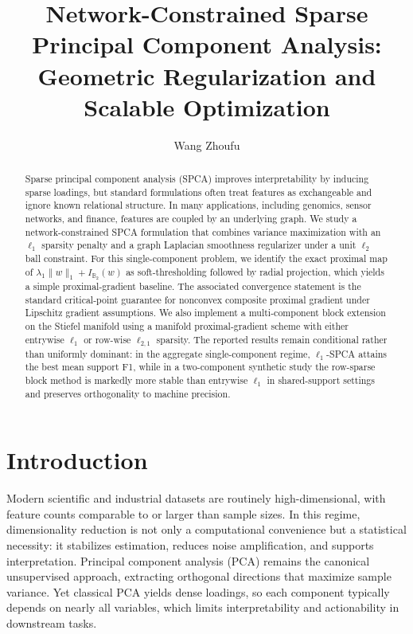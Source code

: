 \documentclass[10pt,twocolumn,letterpaper]{article}
\title{\texorpdfstring{Network-Constrained Sparse Principal Component Analysis: Geometric Regularization and Scalable Optimization}{Network-Constrained Sparse Principal Component Analysis: Geometric Regularization and Scalable Optimization}}
\author{Wang Zhoufu}
\date{}
\theoremstyle{definition}
\begin{document}
\sloppy
\raggedbottom
\maketitle

\begin{abstract}
Sparse principal component analysis (SPCA) improves interpretability by inducing sparse loadings, but standard formulations often treat features as exchangeable and ignore known relational structure. In many applications, including genomics, sensor networks, and finance, features are coupled by an underlying graph. We study a network-constrained SPCA formulation that combines variance maximization with an $\ell_1$ sparsity penalty and a graph Laplacian smoothness regularizer under a unit $\ell_2$ ball constraint. For this single-component problem, we identify the exact proximal map of $\lambda_1\|w\|_1 + I_{\mathbb{B}_2}(w)$ as soft-thresholding followed by radial projection, which yields a simple proximal-gradient baseline. The associated convergence statement is the standard critical-point guarantee for nonconvex composite proximal gradient under Lipschitz gradient assumptions. We also implement a multi-component block extension on the Stiefel manifold using a manifold proximal-gradient scheme with either entrywise $\ell_1$ or row-wise $\ell_{2,1}$ sparsity. The reported results remain conditional rather than uniformly dominant: in the aggregate single-component regime, $\ell_1$-SPCA attains the best mean support F1, while in a two-component synthetic study the row-sparse block method is markedly more stable than entrywise $\ell_1$ in shared-support settings and preserves orthogonality to machine precision.
\end{abstract}

\section{Introduction}
Modern scientific and industrial datasets are routinely high-dimensional, with feature counts comparable to or larger than sample sizes. In this regime, dimensionality reduction is not only a computational convenience but a statistical necessity: it stabilizes estimation, reduces noise amplification, and supports interpretation. Principal component analysis (PCA) remains the canonical unsupervised approach, extracting orthogonal directions that maximize sample variance. Yet classical PCA yields dense loadings, so each component typically depends on nearly all variables, which limits interpretability and actionability in downstream tasks.
\end{document}
